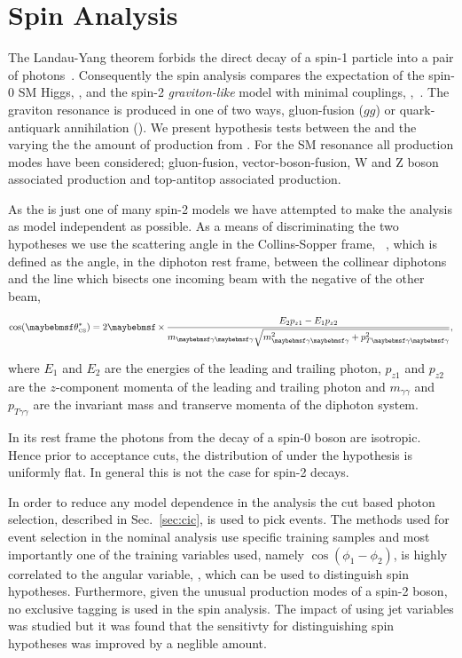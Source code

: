 \chapter{Spin Analysis}
\label{chap:spin}

The Landau-Yang theorem forbids the direct decay of a spin-1 particle into a pair of photons~\cite{Landau1948,Yang1950}. 
Consequently the spin analysis compares the expectation of the spin-0 SM Higgs, \zerop, and the spin-2 \emph{graviton-like} 
model with minimal couplings, \twomp,~\cite{Gao2010}. The \twomp graviton resonance is produced in one of two ways, gluon-fusion ($gg$) 
or quark-antiquark annihilation (\qqbar). We present hypothesis tests between the \zerop and the \twomp varying the the amount of 
\twomp production from \qqbar. For the \zerop SM 
resonance all production modes have been considered; gluon-fusion, vector-boson-fusion, W and Z boson associated production and top-antitop 
associated production. 

As the \twomp is just one of many spin-2 models we have attempted to make the analysis as model independent as possible. As a means of 
discriminating the two hypotheses we use the scattering angle in the Collins-Sopper frame, \costhetastar ~\cite{CollinsSoper1977}, which is defined as the angle, in the diphoton rest frame, between the collinear diphotons 
and the line which bisects one incoming beam with the negative of the other beam, 

\begin{equation}
  \cos(\theta^{\ast}_{\mbox{\tiny{CS}}}) = 2\times\frac{E_{2}p_{z1}-E_{1}p_{z2}}{m_{\gamma\gamma}\sqrt{m^{2}_{\gamma\gamma}+p^{2}_{T\gamma\gamma}}},
\end{equation}

where $E_{1}$ and $E_{2}$ are the energies of the leading and trailing photon, $p_{z1}$ and $p_{z2}$ are the $z$-component momenta 
of the leading and trailing photon and $m_{\gamma\gamma}$ and $p_{T\gamma\gamma}$ are the invariant mass and transerve momenta of the diphoton system.

In its rest frame the photons from the decay of a spin-0 boson are isotropic. Hence prior to acceptance cuts, the distribution of \costhetastar 
under the \zerop hypothesis is uniformly flat. In general this is not the case for spin-2 decays. 

In order to reduce any model dependence in the analysis the cut based photon selection, described in Sec.~\ref{sec:cic}, is used to pick events. The \MVA methods used for event selection in the nominal analysis use specific \SM \MC training samples and most importantly one of the training variables used, namely $\cos(\phi_{1}-\phi_{2})$, is highly correlated to the angular variable, \costhetastar, which can be used to distinguish spin hypotheses. Furthermore, given the unusual production modes of a spin-2 boson, no exclusive tagging is used in the spin analysis. The impact of using jet variables was studied but it was found that the sensitivty for distinguishing spin hypotheses was improved by a neglible amount.

